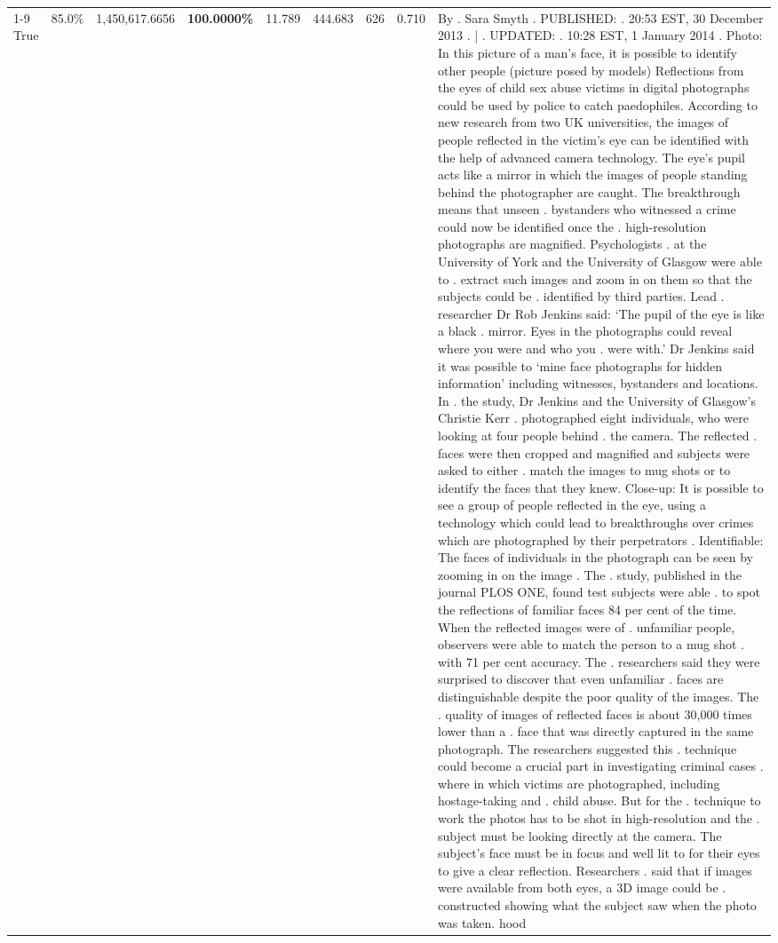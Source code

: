 \begin{table}[H]
\begin{tabular}{lllrlllll}
\cline{1-9}
True & 85.0\% & 1,450,617.6656 & \bfseries \color{red} 100.0000\% & 11.789 & 444.683 & 626 & 0.710 & By . Sara Smyth . PUBLISHED: . 20:53 EST, 30 December 2013 . | . UPDATED: . 10:28 EST, 1 January 2014 . Photo: In this picture of a man's face, it is possible to identify other people (picture posed by models) Reflections from the eyes of child sex abuse victims in digital photographs could be used by police to catch paedophiles. According to new research from two UK universities, the images of people reflected in the victim's eye can be identified with the help of advanced camera technology. The eye's pupil acts like a mirror in which the images of people standing behind the photographer are caught. The breakthrough means that unseen . bystanders who witnessed a crime could now be identified once the . high-resolution photographs are magnified. Psychologists . at the University of York and the University of Glasgow were able to . extract such images and zoom in on them so that the subjects could be . identified by third parties. Lead . researcher Dr Rob Jenkins said: ‘The pupil of the eye is like a black . mirror. Eyes in the photographs could reveal where you were and who you . were with.' Dr Jenkins said it was possible to ‘mine face photographs for hidden information' including witnesses, bystanders and locations. In . the study, Dr Jenkins and the University of Glasgow's Christie Kerr . photographed eight individuals, who were looking at four people behind . the camera. The reflected . faces were then cropped and magnified and subjects were asked to either . match the images to mug shots or to identify the faces that they knew. Close-up: It is possible to see a group of people reflected in the eye, using a technology which could lead to breakthroughs over crimes which are photographed by their perpetrators . Identifiable: The faces of individuals in the photograph can be seen by zooming in on the image . The . study, published in the journal PLOS ONE, found test subjects were able . to spot the reflections of familiar faces 84 per cent of the time. When the reflected images were of . unfamiliar people, observers were able to match the person to a mug shot . with 71 per cent accuracy. The . researchers said they were surprised to discover that even unfamiliar . faces are distinguishable despite the poor quality of the images. The . quality of images of reflected faces is about 30,000 times lower than a . face that was directly captured in the same photograph. The researchers suggested this . technique could become a crucial part in investigating criminal cases . where in which victims are photographed, including hostage-taking and . child abuse. But for the . technique to work the photos has to be shot in high-resolution and the . subject must be looking directly at the camera. The subject's face must be in focus and well lit to for their eyes to give a clear reflection. Researchers . said that if images were available from both eyes, a 3D image could be . constructed showing what the subject saw when the photo was taken. hood \\

\end{tabular}
\end{table}
